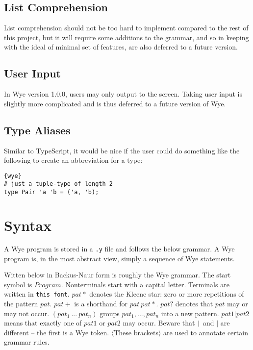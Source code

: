 \documentclass[a4paper, 12pt]{article}
\newcommand{\version}{1.0.0}
\begin{document}
\subsection{List Comprehension}
List comprehension should not be too hard to implement compared to the rest of this project, but it will require some additions to the grammar, and so in keeping with the ideal of minimal set of features, are also deferred to a future version.

\subsection{User Input}
In Wye version \version{}, users may only output to the screen. Taking user input is slightly more complicated and is thus deferred to a future version of Wye.

\subsection{Type Aliases}
Similar to TypeScript, it would be nice if the user could do something like the following to create an abbreviation for a type:
\begin{lstlisting}{wye}
# just a tuple-type of length 2
type Pair 'a 'b = ('a, 'b);
\end{lstlisting}

\section{Syntax}
A Wye program is stored in a \texttt{.y} file and follows the below grammar. A Wye program is, in the most abstract view, simply a sequence of Wye statements.

Witten below in Backus-Naur form is roughly the Wye grammar. The start symbol is $Program$. Nonterminals start with a capital letter. Terminals are written in \texttt{this font}. $pat*$ denotes the Kleene star: zero or more repetitions of the pattern $pat$. $pat+$ is a shorthand for $pat\: pat*$. $pat?$ denotes that $pat$ may or may not occur. $( pat_1\:...\: pat_n )$ groups $pat_1, ..., pat_n$ into a new pattern. $pat1 | pat2$ means that exactly one of $pat1$ or $pat2$ may occur. Beware that \texttt{|} and $|$ are different -- the first is a Wye token. $\langle$These brackets$\rangle$ are used to annotate certain grammar rules.
\end{document}
